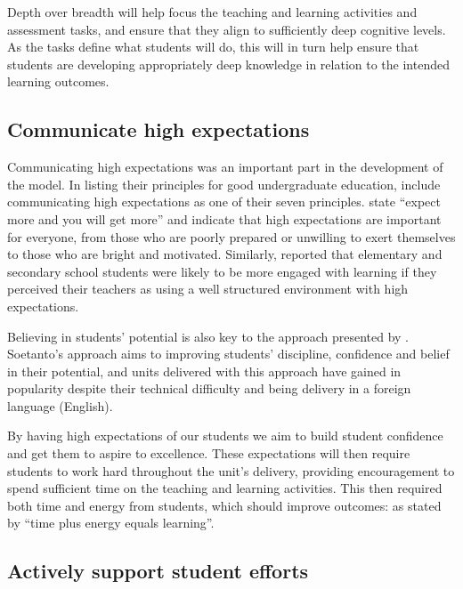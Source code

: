 Depth over breadth will help focus the teaching and learning activities and assessment tasks, and ensure that they align to sufficiently deep cognitive levels. As the tasks define what students will do, this will in turn help ensure that students are developing appropriately deep knowledge in relation to the intended learning outcomes.


\subsection{Communicate high expectations} %
\label{ssub:have_high_expectations_of_students_}

Communicating high expectations was an important part in the development of the model. In listing their principles for good undergraduate education, \citet{Chickering:1987} include communicating high expectations as one of their seven principles. \citet{Chickering:1987} state ``expect more and you will get more'' and indicate that high expectations are important for everyone, from those who are poorly prepared or unwilling to exert themselves to those who are bright and motivated. Similarly, \citet{Klem:2004} reported that elementary and secondary school students were likely to be more engaged with learning if they perceived their teachers as using a well structured environment with high expectations. 

Believing in students' potential is also key to the approach presented by \citet{Soetanto:2003,Soetanto:2012}. Soetanto's approach aims to improving students' discipline, confidence and belief in their potential, and units delivered with this approach have gained in popularity despite their technical difficulty and being delivery in a foreign language (English). 

By having high expectations of our students we aim to build student confidence and get them to aspire to excellence. These expectations will then require students to work hard throughout the unit's delivery, providing encouragement to spend sufficient time on the teaching and learning activities. This then required both time and energy from students, which should improve outcomes: as stated by \citet{Chickering:1987} ``time plus energy equals learning''.


\subsection{Actively support student efforts} %
\label{ssub:actively_support_student_efforts}

